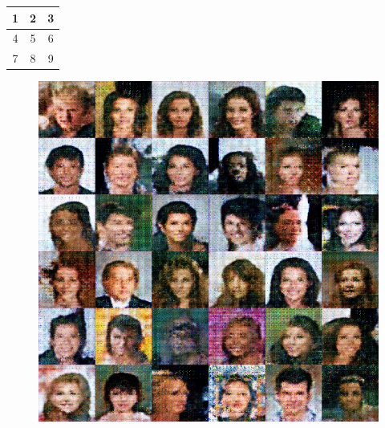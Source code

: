 \documentclass{article}
\begin{document}
\begin{table}\begin{tabular}{c|c|c}
1 & 2 & 3 \\\hline
4 & 5 & 6 \\\hline
7 & 8 & 9
\end{tabular}\end{table}
\begin{figure}
\includegraphics[scale=0.5]{sample_img.jpg}
\end{figure}
\end{document}
